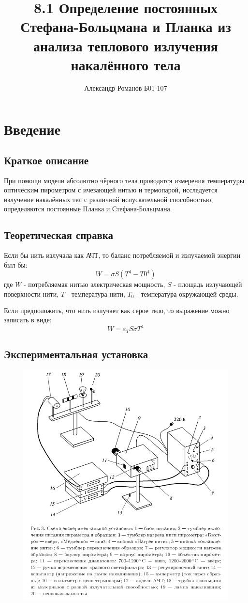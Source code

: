 \documentclass{article}
\author{Александр Романов Б01-107}
\date{}
\title{8.1 Определение постоянных Стефана-Больцмана и Планка из анализа теплового излучения накалённого тела}
\begin{document}
\maketitle
\section{Введение}
\subsection{Краткое описание}
При помощи модели абсолютно чёрного тела проводятся измерения температуры оптическим пирометром с ичезающей
нитью и термопарой, исследуется излучение накалённых тел с различной испускательной способностью, 
определяются постоянные Планка и Стефана-Больцмана.
\subsection{Теоретическая справка}
Если бы нить излучала как АЧТ, то баланс потребляемой и излучаемой энергии был бы:
\[ W = \sigma S\left(T^4 - T0^4\right) \]
где \(W\) - потребляемая нитью электрическая мощность, \(S\) - площадь излучающей поверхности нити,
\(T\) - температура нити, \(T_0\) - температура окружающей среды.

Если предположить, что нить излучает как серое тело, то выражение можно записать в виде:
\[ W = \varepsilon_T S\sigma T^4\]

\subsection{Экспериментальная установка}
\begin{figure}[H]
	\includegraphics[width=\textwidth]{scheme.png}
\end{figure}
\end{document}
